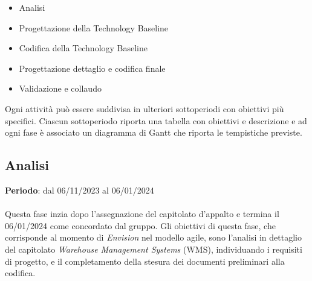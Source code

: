 \begin{itemize}
    \item Analisi
    \item Progettazione della Technology Baseline
    \item Codifica della Technology Baseline
    \item Progettazione dettaglio e codifica finale
    \item Validazione e collaudo
\end{itemize}

Ogni attività può essere suddivisa in ulteriori sottoperiodi con obiettivi più specifici. Ciascun sottoperiodo riporta una tabella con obiettivi e descrizione e ad ogni fase è associato un diagramma di Gantt che riporta le tempistiche previste.

\subsection{Analisi}\label{sec:pianificazione:analisi}

\textbf{Periodo}: dal 06/11/2023 al 06/01/2024\\\\
Questa fase inzia dopo l'assegnazione del capitolato d'appalto e termina il 06/01/2024 come concordato dal gruppo. Gli obiettivi di questa fase, che corrisponde al momento di \textit{Envision} nel modello agile, sono l'analisi in dettaglio del capitolato \textit{Warehouse Management Systems} (WMS), individuando i requisiti di progetto, e il completamento della stesura dei documenti preliminari alla codifica.

